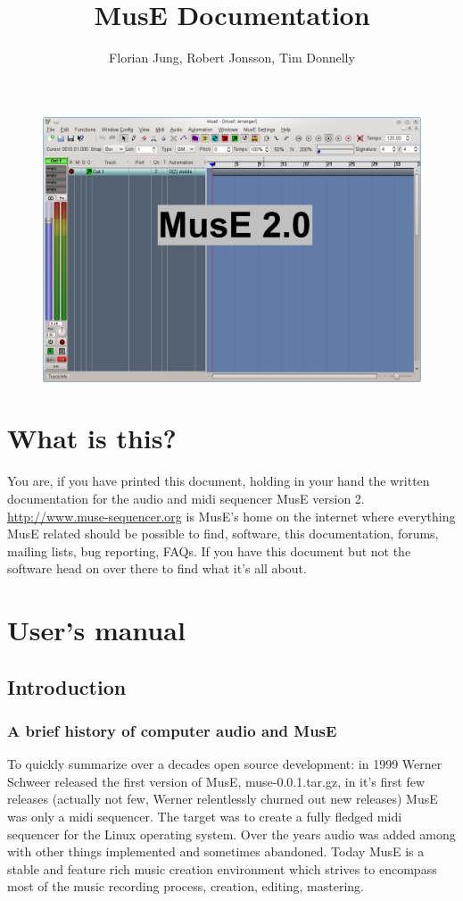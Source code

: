 \documentclass[a4paper]{report}
\author{Florian Jung, Robert Jonsson, Tim Donnelly}
\title{MusE Documentation}
\begin{document}
\begin{figure}[htp]
\centering \includegraphics[width=1.0\textwidth]{pics/muse2}
\label{fig:MusE}
\end{figure}
\tableofcontents
\chapter{What is this?}
You are, if you have printed this document, holding in your hand the
written documentation for the audio and midi sequencer MusE version 2.\\ 
\url{http://www.muse-sequencer.org} is MusE's home on the internet where
everything MusE related should be possible to find, software, this
documentation, forums, mailing lists, bug reporting, FAQs. If you have
this document but not the software head on over there to find what it's
all about.
\chapter{User's manual}

\section{Introduction}
\subsection{A brief history of computer audio and MusE}
To quickly summarize over a decades open source development: in 1999 Werner
 Schweer released the first version of MusE, muse-0.0.1.tar.gz, in it's first
few releases (actually not few, Werner relentlessly churned out new releases)
MusE was only a midi sequencer. The target was to create a fully fledged
midi sequencer for the Linux operating system. Over the years audio was
added among with other things implemented and sometimes abandoned.
Today MusE is a stable and feature rich music creation environment which
strives to encompass most of the music recording process, creation, editing,
mastering.
\end{document}

